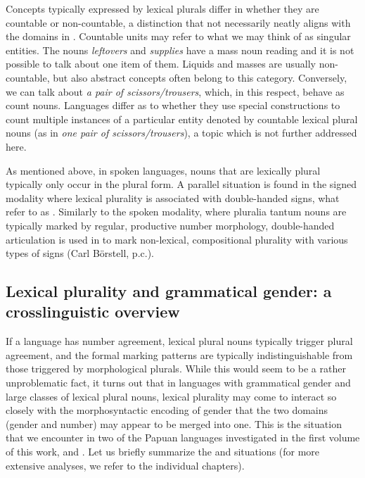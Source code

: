 \documentclass[output=collectionpaper]{langsci/langscibook}
\begin{document}
Concepts typically expressed by lexical plurals differ in whether they are countable or non-countable, a distinction that not necessarily neatly aligns with the domains in . Countable units may refer to what we may think of as singular entities. The  nouns \textit{leftovers} and \textit{supplies} have a mass noun reading and it is not possible to talk about one item of them. Liquids and masses are usually non-countable, but also abstract concepts often belong to this category. Conversely, we can talk about \textit{a pair of scissors/trousers}, which, in this respect, behave as count nouns. Languages differ as to whether they use special constructions to count multiple instances of a particular entity denoted by countable lexical plural nouns (as in  \textit{one pair of scissors/trousers}), a topic which is not further addressed here.

As mentioned above, in spoken languages, nouns that are lexically plural typically only occur in the plural form. A parallel situation is found in the signed modality where lexical plurality is associated with double-handed signs, what \cite{Boerstell2017} refer to as . Similarly to the spoken modality, where pluralia tantum nouns are typically marked by regular, productive number morphology, double-handed articulation is used in  to mark non-lexical, compositional plurality with various types of signs (Carl Börstell, p.c.).

\subsection{Lexical plurality and grammatical gender: a crosslinguistic overview}\label{sec:WDG:9.2}

If a language has number agreement, lexical plural nouns typically trigger plural agreement, and the formal marking patterns are typically indistinguishable from those triggered by morphological plurals. While this would seem to be a rather unproblematic fact, it turns out that in languages with grammatical gender and large classes of lexical plural nouns, lexical plurality may come to interact so closely with the morphosyntactic encoding of gender that the two domains (gender and number) may appear to be merged into one. This is the situation that we encounter in two of the Papuan languages investigated in the first volume of this work,  \citep{Olssonthisyear} and  \citep{Dryerthisyear}. Let us briefly summarize the  and  situations (for more extensive analyses, we refer to the individual chapters).
\end{document}

